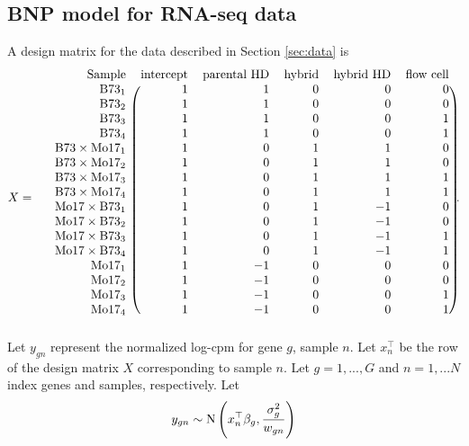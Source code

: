 \subsection{BNP model for RNA-seq data}
\label{sec:model}
A design matrix for the \citet{paschold} data described in Section \ref{sec:data} is
{\footnotesize
\begin{equation*}
X =\quad \begin{blockarray}{rrrrrr}
  \mbox{Sample} & \mbox{intercept} & \mbox{parental HD} & \mbox{hybrid} & \mbox{hybrid HD} & \mbox{flow cell}\\
  \begin{block}{r(rrrrr)}
  \mbox{B73}_1  & 1 &  1 & 0 & 0 & 0\\
  \mbox{B73}_2  & 1 &  1 & 0 & 0 & 0\\
  \mbox{B73}_3  & 1 &  1 & 0 & 0 & 1\\
  \mbox{B73}_4  & 1 &  1 & 0 & 0 & 1\\
  \mbox{B73}\times\mbox{Mo17}_1  & 1 &  0 & 1 & 1 & 0\\
  \mbox{B73}\times\mbox{Mo17}_2  & 1 &  0 & 1 & 1 & 0\\
  \mbox{B73}\times\mbox{Mo17}_3  & 1 &  0 & 1 & 1 & 1\\
  \mbox{B73}\times\mbox{Mo17}_4  & 1 &  0 & 1 & 1 & 1\\
  \mbox{Mo17}\times\mbox{B73}_1  & 1 &  0 & 1 & -1 & 0\\
  \mbox{Mo17}\times\mbox{B73}_2  & 1 &  0 & 1 & -1 & 0\\
  \mbox{Mo17}\times\mbox{B73}_3  & 1 &  0 & 1 & -1 & 1\\
  \mbox{Mo17}\times\mbox{B73}_4  & 1 &  0 & 1 & -1 & 1\\
  \mbox{Mo17}_1 & 1 & -1 & 0 & 0 & 0\\
  \mbox{Mo17}_2 & 1 & -1 & 0 & 0 & 0\\
  \mbox{Mo17}_3 & 1 & -1 & 0 & 0 & 1\\
  \mbox{Mo17}_4 & 1 & -1 & 0 & 0 & 1\\
  \end{block}
\end{blockarray}.
\label{design}
\end{equation*}
}
Let $y_{gn}$ represent the normalized log-cpm for gene $g$, sample $n$. Let $x_{n}^\top$ be the row of the design matrix $X$ corresponding to sample $n$. Let $g=1,...,G$ and $n=1,...N$ index genes and samples, respectively. Let
\begin{equation}
y_{gn} \sim \operatorname{N} \left( x_{n}^\top \beta_g, \frac{\sigma^2_g}{w_{gn}} \right)
\end{equation}
